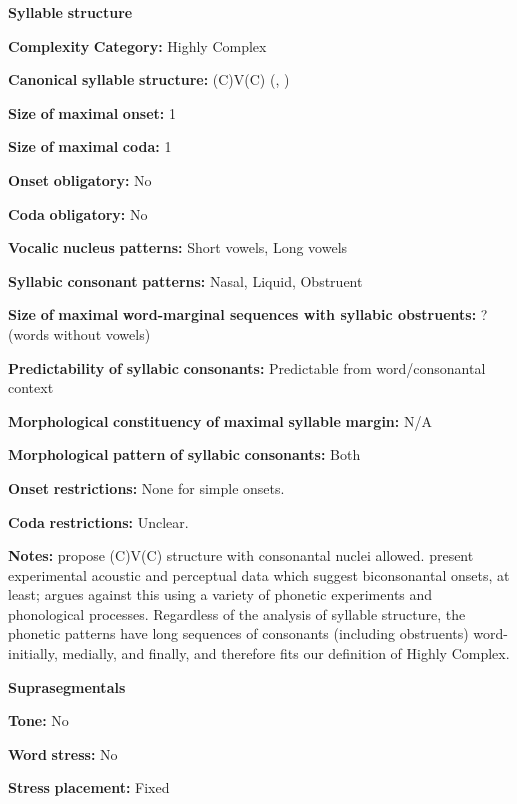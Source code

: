 \textbf{Syllable} \textbf{structure}

\textbf{Complexity} \textbf{Category:} Highly Complex

\textbf{Canonical} \textbf{syllable} \textbf{structure:} (C)V(C) (\citealt{DellElmedlaoui2002}, \citealt{Ridouane2008})

\textbf{Size} \textbf{of} \textbf{maximal} \textbf{onset:} 1

\textbf{Size} \textbf{of} \textbf{maximal} \textbf{coda:} 1

\textbf{Onset} \textbf{obligatory:} No

\textbf{Coda} \textbf{obligatory:} No

\textbf{Vocalic} \textbf{nucleus} \textbf{patterns:} Short vowels, Long vowels

\textbf{Syllabic} \textbf{consonant} \textbf{patterns:} Nasal, Liquid, Obstruent

\textbf{Size} \textbf{of} \textbf{maximal} \textbf{word{}-marginal sequences with syllabic obstruents:} ? (words without vowels)

\textbf{Predictability} \textbf{of} \textbf{syllabic} \textbf{consonants:} Predictable from word/consonantal context

\textbf{Morphological} \textbf{constituency} \textbf{of} \textbf{maximal} \textbf{syllable} \textbf{margin:} N/A

\textbf{Morphological} \textbf{pattern} \textbf{of} \textbf{syllabic} \textbf{consonants:} Both

\textbf{Onset} \textbf{restrictions:} None for simple onsets.

\textbf{Coda} \textbf{restrictions:} Unclear.

\textbf{Notes:} \citet{DellElmedlaoui2002} propose (C)V(C) structure with consonantal nuclei allowed. \citet{PuechLouali1999} present experimental acoustic and perceptual data which suggest biconsonantal onsets, at least; \citet{Ridouane2008} argues against this using a variety of phonetic experiments and phonological processes. Regardless of the analysis of syllable structure, the phonetic patterns have long sequences of consonants (including obstruents) word-initially, medially, and finally, and therefore fits our definition of Highly Complex.

\textbf{Suprasegmentals}

\textbf{Tone:} No

\textbf{Word} \textbf{stress:} No

\textbf{Stress} \textbf{placement:} Fixed

